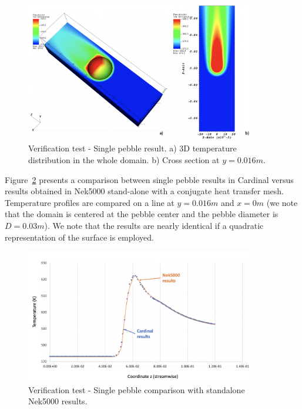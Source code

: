 \begin{figure}[!h]
\centering
\includegraphics[clip=true,width=0.9\textwidth]{Figures/nrs_vv1}
\caption{Verification test - Single pebble result. a) 3D temperature distribution in the whole domain. b) Cross section at $y=0.016 m$.}
\label{f:nrs1}
\end{figure}

Figure~\ref{f:nrs2} presents a comparison between single pebble results in Cardinal versus results obtained in Nek5000 stand-alone with a conjugate heat transfer mesh. Temperature profiles are compared on a line at $y=0.016 m$ and $x=0 m$ (we note that the domain is centered at the pebble center and the pebble diameter is $D=0.03 m$). We note that the results are nearly identical if a quadratic representation of the surface is employed.

\begin{figure}[!h]
\centering
\includegraphics[clip=true,width=0.9\textwidth]{Figures/nrs_vv2}
\caption{Verification test - Single pebble comparison with standalone Nek5000 results. }
\label{f:nrs2}
\end{figure}
